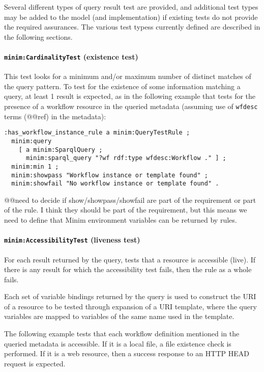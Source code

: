 \documentclass[]{article}
\begin{document}
Several different types of query result test are provided, and
additional test types may be added to the model (and implementation) if
existing tests do not provide the required assurances. The various test
typess currently defined are described in the following sections.

\paragraph{\texttt{minim:CardinalityTest} (existence test)}

This test looks for a minimum and/or maximum number of distinct matches
of the query pattern. To test for the existence of some information
matching a query, at least 1 result is expected, as in the following
example that tests for the presence of a workflow resource in the
queried metadata (assuming use of \texttt{wfdesc} terms (@@ref) in the
metadata):

\begin{verbatim}
:has_workflow_instance_rule a minim:QueryTestRule ;
  minim:query 
    [ a minim:SparqlQuery ; 
      minim:sparql_query "?wf rdf:type wfdesc:Workflow ." ] ;
  minim:min 1 ;
  minim:showpass "Workflow instance or template found" ;
  minim:showfail "No workflow instance or template found" .
\end{verbatim}

@@need to decide if show/showpass/showfail are part of the requirement
or part of the rule. I think they should be part of the requirement, but
this means we need to define that Minim environment variables can be
returned by rules.

\paragraph{\texttt{minim:AccessibilityTest} (liveness test)}

For each result returned by the query, tests that a resource is
accessible (live). If there is any result for which the accessibility
test fails, then the rule as a whole fails.

Each set of variable bindings returned by the query is used to construct
the URI of a resource to be tested through expansion of a URI template,
where the query variables are mapped to variables of the same name used
in the template.

The following example tests that each workflow definition mentioned in
the queried metadata is accessible. If it is a local file, a file
existence check is performed. If it is a web resource, then a success
response to an HTTP HEAD request is expected.
\end{document}
